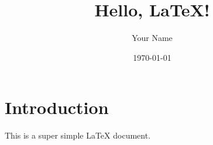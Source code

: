 \documentclass{article}
\begin{document}
\title{Hello, LaTeX!}
\author{Your Name}
\date{\today}

\maketitle

\section{Introduction}
This is a super simple LaTeX document.
\end{document}
